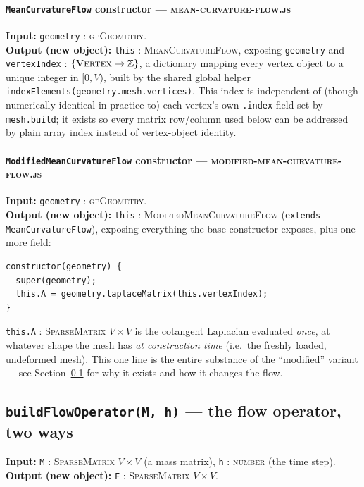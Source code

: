 \documentclass[11pt]{article}
\newcommand{\code}[1]{\texttt{#1}}
\newcommand{\func}[1]{\texttt{\textbf{#1}}}
\newcommand{\type}[1]{\textsc{#1}}
\begin{document}
\paragraph{\func{MeanCurvatureFlow} constructor --- \type{mean-curvature-flow.js}}
\textbf{Input:} \code{geometry} : \type{gpGeometry}.\\
\textbf{Output (new object):} \code{this} : \type{MeanCurvatureFlow}, exposing
\code{geometry} and \code{vertexIndex} : $\{\type{Vertex}\to\mathbb{Z}\}$, a dictionary
mapping every vertex object to a unique integer in $[0,V)$, built by the shared global
helper \code{indexElements(geometry.mesh.vertices)}. This index is independent of (though
numerically identical in practice to) each vertex's own \code{.index} field set by
\code{mesh.build}; it exists so every matrix row/column used below can be addressed by
plain array index instead of vertex-object identity.

\paragraph{\func{ModifiedMeanCurvatureFlow} constructor --- \type{modified-mean-curvature-flow.js}}
\textbf{Input:} \code{geometry} : \type{gpGeometry}.\\
\textbf{Output (new object):} \code{this} : \type{ModifiedMeanCurvatureFlow}
(\code{extends MeanCurvatureFlow}), exposing everything the base constructor exposes, plus
one more field:
\begin{lstlisting}
constructor(geometry) {
  super(geometry);
  this.A = geometry.laplaceMatrix(this.vertexIndex);
}
\end{lstlisting}
\code{this.A} : \type{SparseMatrix} $V\times V$ is the cotangent Laplacian evaluated
\emph{once}, at whatever shape the mesh has \emph{at construction time} (i.e.\ the freshly
loaded, undeformed mesh). This one line is the entire substance of the ``modified'' variant
--- see Section~\ref{sec:buildflow} for why it exists and how it changes the flow.

\subsection{\func{buildFlowOperator(M, h)} --- the flow operator, two ways}
\label{sec:buildflow}
\textbf{Input:} \code{M} : \type{SparseMatrix} $V\times V$ (a mass matrix), \code{h} :
\type{number} (the time step). \textbf{Output (new object):} \code{F} : \type{SparseMatrix}
$V\times V$.
\end{document}
